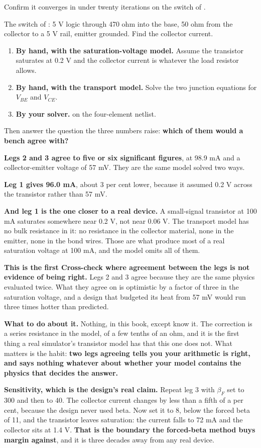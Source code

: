 Confirm it converges in under twenty iterations on the switch of .

\label{c5:ex:8}
The switch of : 5 V logic through 470 ohm into the base, 50 ohm from the collector to a 5 V rail, emitter grounded. Find the collector current.

\begin{enumerate}
  \item \textbf{By hand, with the saturation-voltage model.} Assume the transistor saturates at 0.2 V and the collector current is whatever the load resistor allows.
  \item \textbf{By hand, with the transport model.} Solve the two junction equations for $V_{BE}$ and $V_{CE}$.
  \item \textbf{By your solver.}  on the four-element netlist.
\end{enumerate}
Then answer the question the three numbers raise: \textbf{which of them would a bench agree with?}

\textbf{Legs 2 and 3 agree to five or six significant figures}, at 98.9 mA and a collector-emitter voltage of 57 mV. They are the same model solved two ways.

\textbf{Leg 1 gives 96.0 mA}, about 3 per cent lower, because it assumed 0.2 V across the transistor rather than 57 mV.

\textbf{And leg 1 is the one closer to a real device.} A small-signal transistor at 100 mA saturates somewhere near 0.2 V, not near 0.06 V. The transport model has no bulk resistance in it: no resistance in the collector material, none in the emitter, none in the bond wires. Those are what produce most of a real saturation voltage at 100 mA, and the model omits all of them.

\textbf{This is the first Cross-check where agreement between the legs is not evidence of being right.} Legs 2 and 3 agree because they are the same physics evaluated twice. What they agree on is optimistic by a factor of three in the saturation voltage, and a design that budgeted its heat from 57 mV would run three times hotter than predicted.

\textbf{What to do about it.} Nothing, in this book, except know it. The correction is a series resistance in the model, of a few tenths of an ohm, and it is the first thing a real simulator's transistor model has that this one does not. What matters is the habit: \textbf{two legs agreeing tells you your arithmetic is right, and says nothing whatever about whether your model contains the physics that decides the answer.}

\textbf{Sensitivity, which is the design's real claim.} Repeat leg 3 with $\beta_F$ set to 300 and then to 40. The collector current changes by less than a fifth of a per cent, because the design never used beta. Now set it to 8, below the forced beta of 11, and the transistor leaves saturation: the current falls to 72 mA and the collector sits at 1.4 V. \textbf{That is the boundary the forced-beta method buys margin against}, and it is three decades away from any real device.
